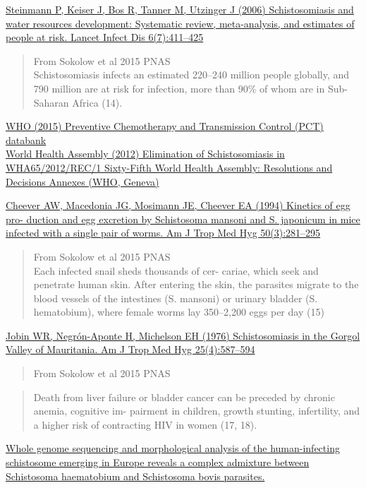 \documentclass[10,portrait]{article}
\begin{document}
\href{}{Steinmann P, Keiser J, Bos R, Tanner M, Utzinger J (2006)
Schistosomiasis and water resources development: Systematic review,
meta-analysis, and estimates of people at risk. Lancet Infect Dis
6(7):411--425}

\begin{quote}
From Sokolow et al 2015 PNAS\\
Schistosomiasis infects an estimated 220--240 million people globally,
and 790 million are at risk for infection, more than 90\% of whom are in
Sub-Saharan Africa (14).
\end{quote}

\href{www.who.int/neglected_diseases/preventive_chemotherapy/databank/en/}{WHO
(2015) Preventive Chemotherapy and Transmission Control (PCT)
databank}\\
\href{}{World Health Assembly (2012) Elimination of Schistosomiasis in
WHA65/2012/REC/1 Sixty-Fifth World Health Assembly: Resolutions and
Decisions Annexes (WHO, Geneva)}

\href{}{Cheever AW, Macedonia JG, Mosimann JE, Cheever EA (1994)
Kinetics of egg pro- duction and egg excretion by Schistosoma mansoni
and S. japonicum in mice infected with a single pair of worms. Am J Trop
Med Hyg 50(3):281--295}

\begin{quote}
From Sokolow et al 2015 PNAS\\
Each infected snail sheds thousands of cer- cariae, which seek and
penetrate human skin. After entering the skin, the parasites migrate to
the blood vessels of the intestines (S. mansoni) or urinary bladder (S.
hematobium), where female worms lay 350--2,200 eggs per day (15)
\end{quote}

\href{}{Jobin WR, Negrón-Aponte H, Michelson EH (1976) Schistosomiasis
in the Gorgol Valley of Mauritania. Am J Trop Med Hyg 25(4):587--594}

\begin{quote}
From Sokolow et al 2015 PNAS
\end{quote}

\begin{quote}
Death from liver failure or bladder cancer can be preceded by chronic
anemia, cognitive im- pairment in children, growth stunting,
infertility, and a higher risk of contracting HIV in women (17, 18).
\end{quote}

\href{https://www.biorxiv.org/content/early/2018/08/11/387969}{Whole
genome sequencing and morphological analysis of the human-infecting
schistosome emerging in Europe reveals a complex admixture between
Schistosoma haematobium and Schistosoma bovis parasites.}
\end{document}
